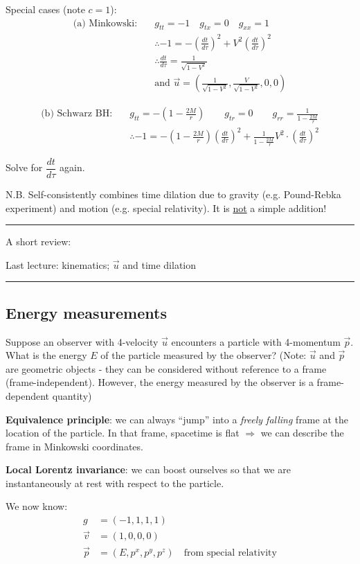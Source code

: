 \documentclass[a4paper]{article} %
\newcommand{\review}[1]
{
\hrule
A short review:

#1
\hrule
}
\begin{document}
Special cases (note $c=1$):
\begin{align*}
\text{(a) Minkowski:}\quad& g_{tt}=-1\quad g_{tx}=0\quad g_{xx}=1\\
&\therefore -1=-\left(\frac{dt}{d\tau}\right)^2+V^2\left(\frac{dt}{d\tau}\right)^2\\
&\therefore \frac{dt}{d\tau}=\frac{1}{\sqrt{1-V^2}}\\
&\text{and }\vec{u}=\left(\frac{1}{\sqrt{1-V^2}},\frac{V}{\sqrt{1-V^2}},0,0\right)
\end{align*}

\begin{align*}
\text{(b) Schwarz BH:}\quad &g_{tt}=-\left(1-\frac{2M}{r}\right)\qquad g_{tr}=0\qquad g_{rr}=\frac{1}{1-\frac{2M}{r}}\\
&\therefore -1= -\left(1-\frac{2M}{r}\right)\left(\frac{dt}{d\tau}\right)^2+\frac{1}{1-\frac{2M}{r}}V^2 \cdot\left(\frac{dt}{d\tau}\right)^2
\end{align*}

Solve for $\dfrac{dt}{d\tau}$ again.

N.B. Self-consistently combines time dilation due to gravity (e.g. Pound-Rebka experiment) and motion (e.g. special relativity). It is \underline{not} a simple addition!


\review{Last lecture: kinematics; $\vec{u}$ and time dilation}


\subsection{Energy measurements}

Suppose an observer with 4-velocity $\vec{u}$ encounters a particle with 4-momentum $\vec{p}$. What is the energy $E$ of the particle measured by the observer? (Note: $\vec{u}$ and $\vec{p}$ are geometric objects - they can be considered without reference to a frame (frame-independent). However, the energy measured by the observer is a frame-dependent quantity)

\textbf{Equivalence principle}: we can always ``jump'' into a \emph{freely falling} frame at the location of the particle. In that frame, spacetime is flat $\Rightarrow$ we can describe the frame in Minkowski coordinates. 

\textbf{Local Lorentz invariance}: we can boost ourselves so that we are instantaneously at rest with respect to the particle.

We now know:
\begin{align*}
g&=(-1,1,1,1)\\
\vec{v}&=(1,0,0,0)\\
\vec{p}&=(E,p^x,p^y,p^z)\quad \text{from special relativity}
\end{align*}
\end{document}
